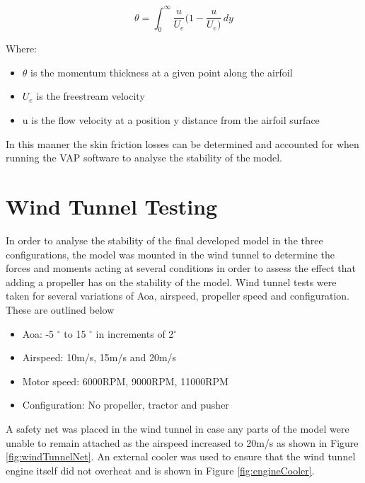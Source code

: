 \begin{equation}
    \theta = \int_{0}^{\infty} \frac{u}{U_e} ( 1 - \frac{u}{U_e) } \,dy
    \label{eqn:XFOIL}
\end{equation}

Where:
\begin{itemize}
    \item $\theta$ is the momentum thickness at a given point along the airfoil
    \item $U_e$ is the freestream velocity 
    \item u is the flow velocity at a position y distance from the airfoil surface
\end{itemize}

In this manner the skin friction losses can be determined and accounted for when running the VAP software to analyse the stability of the model. 

\section{Wind Tunnel Testing}
In order to analyse the stability of the final developed model in the three configurations, the model was mounted in the wind tunnel to determine the forces and moments acting at several conditions in order to assess the effect that adding a propeller has on the stability of the model. Wind tunnel tests were taken for several variations of Aoa, airspeed, propeller speed and configuration. These are outlined below

\begin{itemize}
    \item Aoa: -5 $^{\circ}$ to 15 $^{\circ}$ in increments of 2$^{\circ}$
    \item Airspeed: 10m/s, 15m/s and 20m/s
    \item Motor speed: 6000RPM, 9000RPM, 11000RPM
    \item Configuration: No propeller, tractor and pusher
\end{itemize}

A safety net was placed in the wind tunnel in case any parts of the model were unable to remain attached as the airspeed increased to 20m/s as shown in Figure \ref{fig:windTunnelNet}. An external cooler was used to ensure that the wind tunnel engine itself did not overheat and is shown in Figure \ref{fig:engineCooler}.


